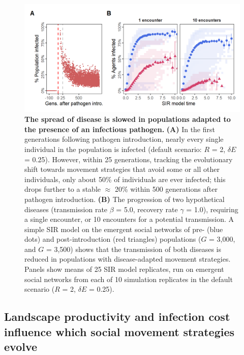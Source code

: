 \begin{figure}[!h]
    \centering
    \includegraphics[width=0.9\linewidth]{figures/pathomove/fig_04.png}
    \caption{
        \textbf{The spread of disease is slowed in populations adapted to the presence of an infectious pathogen.}
        \textbf{(A)} In the first generations following pathogen introduction, nearly every single individual in the population is infected (default scenario: $R$ = 2, $\delta E$ = 0.25).
        However, within 25 generations, tracking the evolutionary shift towards movement strategies that avoid some or all other individuals, only about 50\% of individuals are ever infected; this drops further to a stable $\approx$ 20\% within 500 generations after pathogen introduction.
        \textbf{(B)} The progression of two hypothetical diseases (transmission rate $\beta$ = 5.0, recovery rate $\gamma$ = 1.0), requiring  a single encounter, or 10 encounters for a potential transmission.
        A simple SIR model on the emergent social networks of pre- (blue dots) and post-introduction (red triangles) populations ($G$ = 3,000, and $G$ = 3,500) shows that the transmission of both diseases is reduced in populations with disease-adapted movement strategies.
        Panels show means of 25 SIR model replicates, run on emergent social networks from each of 10 simulation replicates in the default scenario ($R$ = 2, $\delta E$ = 0.25).
    }\label{patho_fig_04}
\end{figure}

\subsection*{Landscape productivity and infection cost influence which social movement strategies evolve}

